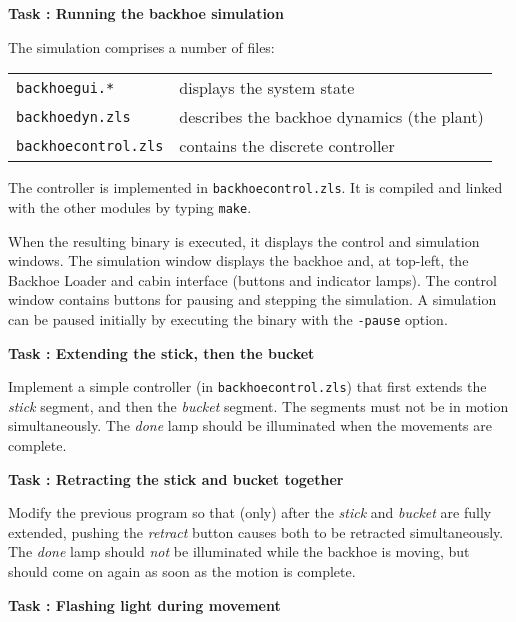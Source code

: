 \documentclass[12pt]{article}
\newcounter{task}
\newcommand{\nexttask}[1]{%
	\addtocounter{task}{1}%
	\textbf{\large{}Task \thetask: #1\ }\rule{0em}{4ex}}
\begin{document}
\nexttask{Running the backhoe simulation} %

The simulation comprises a number of files:

\begin{tabular}{ll}
    \texttt{backhoegui.*} &
        displays the system state \\

    \texttt{backhoedyn.zls} &
        describes the backhoe dynamics (the plant) \\

    \texttt{backhoecontrol.zls} &
        contains the discrete controller\\
\end{tabular}

\noindent
The controller is implemented in \texttt{backhoecontrol.zls}.
It is compiled and linked with the other modules by typing \verb+make+.

When the resulting binary is executed, it displays the control and 
simulation windows.
The simulation window displays the backhoe and, at top-left, the Backhoe 
Loader and cabin interface (buttons and indicator lamps).
The control window contains buttons for pausing and stepping the simulation.
A simulation can be paused initially by executing the binary with the 
\verb+-pause+ option.

\nexttask{Extending the stick, then the bucket} %

Implement a simple controller (in \texttt{backhoecontrol.zls}) that first 
extends the \emph{stick} segment, and then the \emph{bucket} segment.
The segments must not be in motion simultaneously.
The \emph{done} lamp should be illuminated when the movements are complete.

\nexttask{Retracting the stick and bucket together} %

Modify the previous program so that (only) after the \emph{stick} and 
\emph{bucket} are fully extended, pushing the \emph{retract} button causes 
both to be retracted simultaneously.
The \emph{done} lamp should \emph{not} be illuminated while the backhoe is 
moving, but should come on again as soon as the motion is complete.

\nexttask{Flashing light during movement} %
\end{document}
